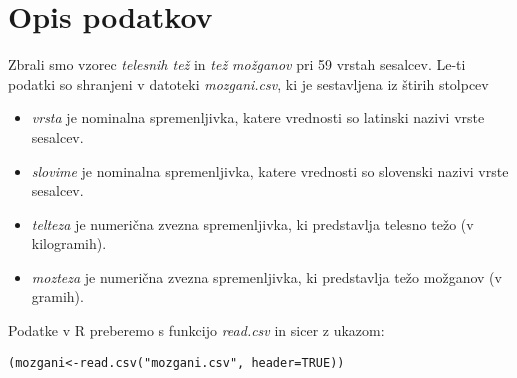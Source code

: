 \section{Opis podatkov}

Zbrali smo vzorec \emph{telesnih tež} in \emph{tež možganov} pri 59 vrstah sesalcev.
Le-ti podatki so shranjeni v datoteki \emph{mozgani.csv}, ki je sestavljena iz štirih stolpcev

\begin{itemize}
    \item \emph{vrsta} je nominalna spremenljivka, katere vrednosti so latinski nazivi vrste sesalcev.
    \item \emph{slovime} je nominalna spremenljivka, katere vrednosti so slovenski nazivi vrste sesalcev.
    \item \emph{telteza} je numerična zvezna spremenljivka, ki predstavlja telesno težo (v kilogramih).
    \item \emph{mozteza} je numerična zvezna spremenljivka, ki predstavlja težo možganov (v gramih).
\end{itemize}

\noindent
Podatke v R preberemo s funkcijo \emph{read.csv} in sicer z ukazom:

\verb|(mozgani<-read.csv("mozgani.csv", header=TRUE))|

